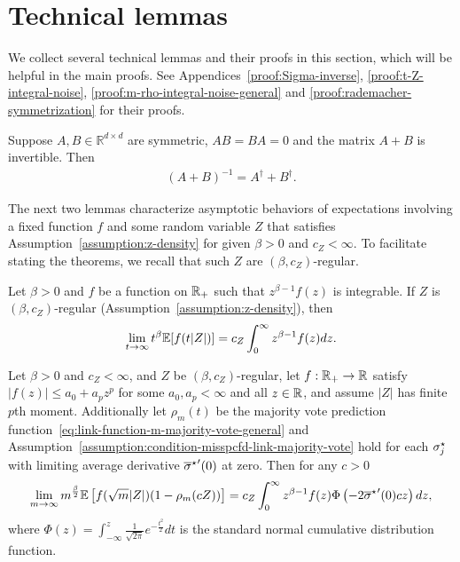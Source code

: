 \section{Technical lemmas} \label{sec:technical}

We collect several technical lemmas and their proofs in this section, which
will be helpful in the main proofs. See
Appendices~\ref{proof:Sigma-inverse}, \ref{proof:t-Z-integral-noise},
\ref{proof:m-rho-integral-noise-general} and
\ref{proof:rademacher-symmetrization} for their proofs.

\begin{lemma} \label{lem:Sigma-inverse}
  Suppose $A, B \in \mathbb{R}^{d \times d}$ are symmetric, $AB = BA = 0$
  and the matrix $A+B$ is invertible. Then
  \begin{align*}
    \left(A +B\right)^{-1} = A^\dagger + B^\dagger.
  \end{align*}
\end{lemma}

The next two lemmas characterize asymptotic behaviors of expectations
involving a fixed function $f$ and some random variable $Z$ that satisfies
Assumption~\ref{assumption:z-density} for given $\beta>0$ and $c_Z <
\infty$. To facilitate stating the theorems, we recall
that such $Z$ are $(\beta,
c_Z)$-regular.
\begin{lemma} \label{lem:t-Z-integral-noise}
  Let $\beta > 0$ and $f$ be a function on $\mathbb{R}_+$ such that
  $z^{\beta-1}f(z)$ is integrable. If $Z$ is $(\beta,
  c_Z)$-regular (Assumption~\ref{assumption:z-density}), then
  \begin{align*}
    \lim_{t \to \infty} t^\beta \mathbb{E} [f(t|Z|)] =  c_Z \int_{0}^{\infty} z^{\beta - 1} f(z) dz.
  \end{align*}
\end{lemma}

\begin{lemma} \label{lem:m-rho-integral-noise-general}
  Let $\beta > 0$ and $c_Z < \infty$, and $Z$ be $(\beta, c_Z)$-regular, let
  $f : \mathbb{R}_+ \to \mathbb{R}$ satisfy $|f(z)| \leq a_0 + a_p z^p$ for some $a_0, a_p <
  \infty$ and all $z \in \mathbb{R}$, and assume $|Z|$ has finite $p$th
  moment. Additionally let $\rho_m(t)$ be the majority vote prediction
  function~\eqref{eq:link-function-m-majority-vote-general} and
  Assumption~\ref{assumption:condition-misspcfd-link-majority-vote} hold for
  each $\sigma_j^\star$ with limiting average derivative
  ${\overline{\sigma}^\star}'(0)$ at zero. Then for any $c > 0$
  \begin{align*}
    \lim_{m \to \infty} m^{\frac{\beta}{2}}\mathbb{E} \left[f(\sqrt{m}|Z|) (1 - \rho_m(cZ))\right] = c_Z \int_0^\infty z^{\beta - 1} f(z) \Phi \left(-2 {\overline{\sigma}^\star}'(0) cz\right) dz,
  \end{align*}
  where $\Phi(z) = \int_{-\infty}^z \frac{1}{\sqrt{2 \pi}}
  e^{-\frac{t^2}{2}}dt$ is the standard normal cumulative distribution function.
\end{lemma}

